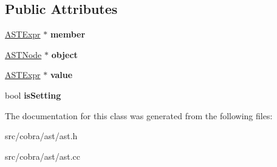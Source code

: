 \subsection*{Public Attributes}
\begin{DoxyCompactItemize}
\item 
\hypertarget{class_cobra_1_1internal_1_1_a_s_t_object_member_chain_expr_ab6a85fbf7191951c1de17a4208a637e7}{\hyperlink{class_cobra_1_1internal_1_1_a_s_t_expr}{A\+S\+T\+Expr} $\ast$ {\bfseries member}}\label{class_cobra_1_1internal_1_1_a_s_t_object_member_chain_expr_ab6a85fbf7191951c1de17a4208a637e7}

\item 
\hypertarget{class_cobra_1_1internal_1_1_a_s_t_object_member_chain_expr_a1198c2d503d63dec9a41f11034a59a33}{\hyperlink{class_cobra_1_1internal_1_1_a_s_t_node}{A\+S\+T\+Node} $\ast$ {\bfseries object}}\label{class_cobra_1_1internal_1_1_a_s_t_object_member_chain_expr_a1198c2d503d63dec9a41f11034a59a33}

\item 
\hypertarget{class_cobra_1_1internal_1_1_a_s_t_object_member_chain_expr_a1c21198f3672ed23e7458c1818525659}{\hyperlink{class_cobra_1_1internal_1_1_a_s_t_expr}{A\+S\+T\+Expr} $\ast$ {\bfseries value}}\label{class_cobra_1_1internal_1_1_a_s_t_object_member_chain_expr_a1c21198f3672ed23e7458c1818525659}

\item 
\hypertarget{class_cobra_1_1internal_1_1_a_s_t_object_member_chain_expr_a2c09e14e1007ea7f7e014944ef98a7c0}{bool {\bfseries is\+Setting}}\label{class_cobra_1_1internal_1_1_a_s_t_object_member_chain_expr_a2c09e14e1007ea7f7e014944ef98a7c0}

\end{DoxyCompactItemize}


The documentation for this class was generated from the following files\+:\begin{DoxyCompactItemize}
\item 
src/cobra/ast/ast.\+h\item 
src/cobra/ast/ast.\+cc\end{DoxyCompactItemize}
